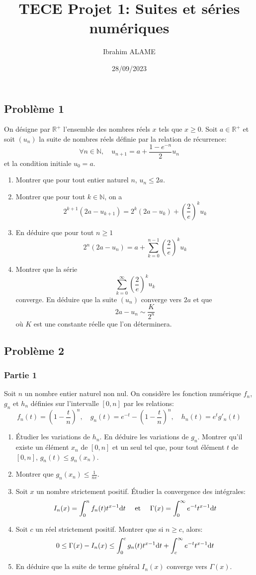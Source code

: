 \documentclass{article}
\title{TECE Projet 1: Suites et séries numériques}
\author{Ibrahim ALAME}
\date{28/09/2023}
\def \de {{\rm d}}
\begin{document}
\maketitle
\begin{center}
\end{center}
\subsection*{Problème 1}
On désigne par $\mathbb{R}^+$ l'ensemble des nombres réels $x$ tels que $x\geq 0$. Soit $a\in \mathbb{R}^+$ et soit $(u_n)$ la suite de nombres réels définie par la relation de récurrence:
\[\forall n\in \mathbb{N},\quad u_{n+1}=a+\frac{1-e^{-n}}{2}u_n\]
et la condition initiale $u_0=a$.
\begin{enumerate}
\item Montrer que pour tout entier naturel $n$, $u_n\leq 2a$.
\item Montrer que pour tout $k\in \mathbb{N}$, on a
\[2^{k+1}(2a-u_{k+1})=2^k(2a-u_k)+\left(\frac{2}{e}\right)^ku_k\]
\item En déduire que pour tout $n\geq 1$
\[2^n(2a-u_n)=a+\sum_{k=0}^{n-1}\left(\frac{2}{e}\right)^ku_k\]
\item Montrer que la série \[\sum_{k=0}^\infty\left(\frac{2}{e}\right)^ku_k\] converge. En déduire que la suite $(u_n)$ converge vers $2a$ et que \[2a-u_n\sim \frac{K}{2^n}\] où $K$ est une constante réelle que l'on déterminera.
\end{enumerate}

\subsection*{Problème 2}
\subsubsection*{Partie 1}
Soit $n$ un nombre entier naturel non nul. On considère les fonction numérique $f_n$, $g_n$ et $h_n$ définies sur l'intervalle $[0,n]$ par les relations:
\[f_n(t)=(1-\frac tn)^n,\quad g_n(t)=e^{-t}-(1-\frac tn)^n,\quad h_n(t)=e^tg'_n(t)\] 
\begin{enumerate}
\item Étudier les variations de $h_n$. En déduire les variations de $g_n$. Montrer qu'il existe un élément $x_n$ de $[0,n]$ et un seul tel que, pour tout élément $t$ de $[0,n]$, $g_n(t)\leq g_n(x_n)$.
\item Montrer que $g_n(x_n)\leq \frac{1}{ne}$.
\item Soit $x$ un nombre strictement positif. Étudier la convergence des intégrales:
\[I_n(x)=\int_0^nf_n(t)t^{x-1}\de t\quad\mbox{ et }\quad \Gamma(x)=\int_0^\infty e^{-t}t^{x-1}\de t\]
\item Soit $c$ un réel strictement positif. Montrer que si $n\geq c$, alors:
\[0\leq \Gamma(x) - I_n(x)\leq \int_0^cg_n(t)t^{x-1}\de t +\int_c^\infty e^{-t}t^{x-1}\de t\]
\item En déduire que la suite de terme général $I_n(x)$ converge vers $\Gamma(x)$.
\end{enumerate}
\end{document}
